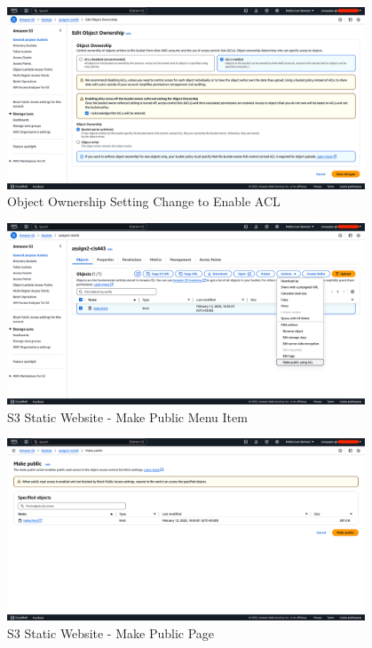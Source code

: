 \documentclass[a4paper,12pt]{article}
\begin{document}
\begin{figure}[H]
    \centering
    \includegraphics[width=0.95\textwidth]{host-static-website-10.png}
    \caption{Object Ownership Setting Change to Enable ACL}
    \label{fig:static10}
\end{figure}

\begin{figure}[H]
    \centering
    \includegraphics[width=0.95\textwidth]{host-static-website-11.png}
    \caption{S3 Static Website - Make Public Menu Item}
    \label{fig:static11}
\end{figure}

\begin{figure}[H]
    \centering
    \includegraphics[width=0.95\textwidth]{host-static-website-12.png}
    \caption{S3 Static Website - Make Public Page}
    \label{fig:static12}
\end{figure}
\end{document}
